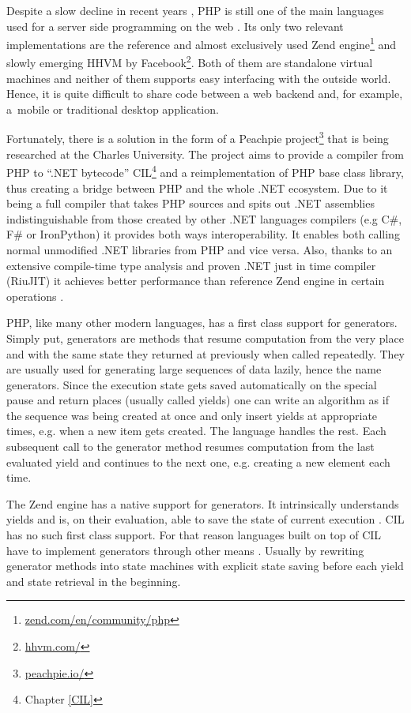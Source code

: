 
Despite a slow decline in recent years \citep{Tiobe}, PHP is still one of the main languages used for a server side programming on the web \citep{Stack}. Its only two relevant implementations are the reference and almost exclusively used Zend engine\footnote{\href{http://www.zend.com/en/community/php}{zend.com/en/community/php}} and slowly emerging HHVM by Facebook\footnote{\href{http://hhvm.com/}{hhvm.com/}}. Both of them are standalone virtual machines and neither of them supports easy interfacing with the outside world. Hence, it is quite difficult to share code between a web backend and, for example, a~mobile or traditional desktop application.

Fortunately, there is a solution in the form of a Peachpie project\footnote{\href{http://www.peachpie.io/}{peachpie.io/}} that is being researched at the Charles University. The project aims to provide a compiler from PHP to “.NET bytecode” CIL\footnote{Chapter \ref{CIL}} and a reimplementation of PHP base class library, thus creating a bridge between PHP and the whole .NET ecosystem. Due to it being a full compiler that takes PHP sources and spits out .NET assemblies indistinguishable from those created by other .NET languages compilers (e.g C\#, F\# or IronPython) it provides both ways interoperability. It enables both calling normal unmodified .NET libraries from PHP and vice versa. Also, thanks to an extensive compile-time type analysis and proven .NET just in time compiler (RiuJIT) it achieves better performance than reference Zend engine in certain operations \citep{PchpBenchBlog, PchpBenchSite}.

PHP, like many other modern languages, has a first class support for generators. Simply put, generators are methods that resume computation from the very place and with the same state they returned at previously when called repeatedly. They are usually used for generating large sequences of data lazily, hence the name generators. Since the execution state gets saved automatically on the special pause and return places (usually called yields) one can write an algorithm as if the sequence was being created at once and only insert yields at appropriate times, e.g. when a new item gets created. The language handles the rest. Each subsequent call to the generator method resumes computation from the last evaluated yield and continues to the next one, e.g. creating a new element each time. 

The Zend engine has a native support for generators. It intrinsically understands yields and is, on their evaluation, able to save the state of current execution \citep{ZendGen}. CIL has no such first class support. For that reason languages built on top of CIL have to implement generators through other means \citep{CSharpGen}. Usually by rewriting generator methods into state machines with explicit state saving before each yield and state retrieval in the beginning.

